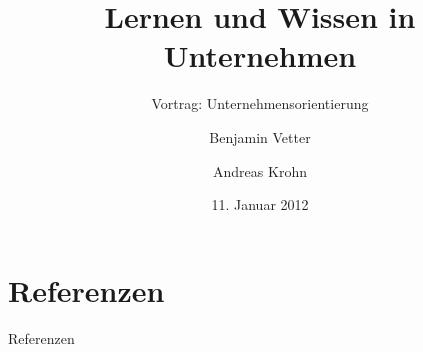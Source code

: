 \documentclass[ngerman,compress,hyperref={bookmarks}]{beamer}
\title{Lernen und Wissen in Unternehmen}
\subtitle{Vortrag: Unternehmensorientierung}
\author{Benjamin Vetter \and Andreas Krohn}
\institute[HAW]{Hochschule für Angewandte Wissenschaften Hamburg}
\date[WS 2011/12]{11. Januar 2012}
\begin{document}



\section{Referenzen}

\begin{frame}[allowframebreaks]{Referenzen}


\end{frame}
\end{document}
